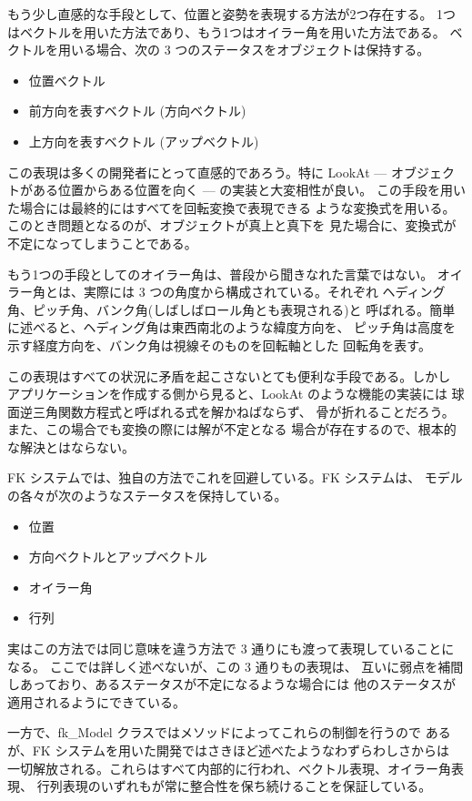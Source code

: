 もう少し直感的な手段として、位置と姿勢を表現する方法が2つ存在する。
1つはベクトルを用いた方法であり、もう1つはオイラー角を用いた方法である。
ベクトルを用いる場合、次の 3 つのステータスをオブジェクトは保持する。
\begin{itemize}
 \item 位置ベクトル
 \item 前方向を表すベクトル (方向ベクトル)
 \item 上方向を表すベクトル (アップベクトル)
\end{itemize}
この表現は多くの開発者にとって直感的であろう。特に LookAt ---
オブジェクトがある位置からある位置を向く --- の実装と大変相性が良い。
この手段を用いた場合には最終的にはすべてを回転変換で表現できる
ような変換式を用いる。このとき問題となるのが、オブジェクトが真上と真下を
見た場合に、変換式が不定になってしまうことである。

もう1つの手段としてのオイラー角は、普段から聞きなれた言葉ではない。
オイラー角とは、実際には 3 つの角度から構成されている。それぞれ
ヘディング角、ピッチ角、バンク角(しばしばロール角とも表現される)と
呼ばれる。簡単に述べると、ヘディング角は東西南北のような緯度方向を、
ピッチ角は高度を示す経度方向を、バンク角は視線そのものを回転軸とした
回転角を表す。

この表現はすべての状況に矛盾を起こさないとても便利な手段である。しかし
アプリケーションを作成する側から見ると、LookAt のような機能の実装には
球面逆三角関数方程式と呼ばれる式を解かねばならず、
骨が折れることだろう。また、この場合でも変換の際には解が不定となる
場合が存在するので、根本的な解決とはならない。

FK システムでは、独自の方法でこれを回避している。FK システムは、
モデルの各々が次のようなステータスを保持している。
\begin{itemize}
 \item 位置
 \item 方向ベクトルとアップベクトル
 \item オイラー角
 \item 行列
\end{itemize}
実はこの方法では同じ意味を違う方法で 3 通りにも渡って表現していることになる。
ここでは詳しく述べないが、この 3 通りもの表現は、
互いに弱点を補間しあっており、あるステータスが不定になるような場合には
他のステータスが適用されるようにできている。

一方で、fk\_Model クラスではメソッドによってこれらの制御を行うので
あるが、FK システムを用いた開発ではさきほど述べたようなわずらわしさからは
一切解放される。これらはすべて内部的に行われ、ベクトル表現、オイラー角表現、
行列表現のいずれもが常に整合性を保ち続けることを保証している。

